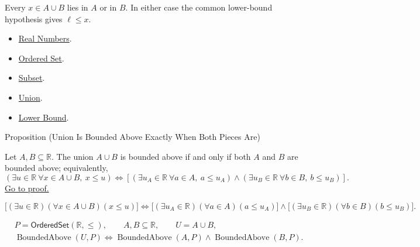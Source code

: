 \begin{remark*}[Interpretation]
Every $x\in A\cup B$ lies in $A$ or in $B$.  In either case the common
lower-bound hypothesis gives $\ell\leq x$.
\end{remark*}

\begin{dependencies}
\begin{itemize}
\item \hyperref[def:reals]{Real Numbers}.
\item \hyperref[def:ordered-set]{Ordered Set}.
\item \hyperref[def:subset]{Subset}.
\item \hyperref[def:union]{Union}.
\item \hyperref[def:real-lower-bound]{Lower Bound}.
\end{itemize}
\end{dependencies}

\begin{propositionbox}{Proposition (Union Is Bounded Above Exactly When Both Pieces Are)}
\begin{proposition}
\label{prop:union-bounded-above-iff-pieces-bounded-above}
Let $A,B\subseteq\mathbb{R}$. The union $A\cup B$ is bounded above if and
only if both $A$ and $B$ are bounded above; equivalently,
\[
\left(\exists u\in\mathbb{R}\ \forall x\in A\cup B,\ x\leq u\right)
\Longleftrightarrow
\left[
\left(\exists u_A\in\mathbb{R}\ \forall a\in A,\ a\leq u_A\right)
\land
\left(\exists u_B\in\mathbb{R}\ \forall b\in B,\ b\leq u_B\right)
\right].
\]
\hyperref[prf:union-bounded-above-iff-pieces-bounded-above]{Go to proof.}
\end{proposition}
\end{propositionbox}

\begin{remark*}
\[
\bigl[(\exists u\in\mathbb{R})(\forall x\in A\cup B)(x\leq u)\bigr]
\Longleftrightarrow
\bigl[(\exists u_A\in\mathbb{R})(\forall a\in A)(a\leq u_A)\bigr]
\land
\bigl[(\exists u_B\in\mathbb{R})(\forall b\in B)(b\leq u_B)\bigr].
\]
\end{remark*}

\begin{remark*}
\[
\begin{aligned}
&P=\mathsf{OrderedSet}(\mathbb{R},\leq),\qquad A,B\subseteq\mathbb{R},\qquad U=A\cup B,\\
&\operatorname{BoundedAbove}(U,P)
\Longleftrightarrow
\operatorname{BoundedAbove}(A,P)\land\operatorname{BoundedAbove}(B,P).
\end{aligned}
\]
\end{remark*}


